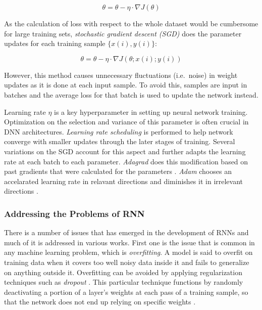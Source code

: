 \begin{equation}
 \theta =  \theta -  \eta \cdot \nabla J(  \theta )
\end{equation}

As the calculation of loss with respect to the whole dataset would be cumbersome for large training sets, \textit{stochastic gradient descent (SGD)} \citep{bengio_dl, sgd2} does the parameter updates for each training sample $\{ x ( i ) , y ( i ) \}$:

\begin{equation}
    \theta = \theta -  \eta \cdot  \nabla J ( \theta  ;  x ( i  ) ;  y  ( i ) )
\end{equation}

However, this method causes unnecessary fluctuations (i.e.~noise) in weight updates as it is done at each input sample. To avoid this, samples are input in batches and the average loss for that batch is used to update the network instead.

Learning rate $\eta$ is a key hyperparameter in setting up neural network training. Optimization on the selection and variance of this parameter is often crucial in DNN architectures. \textit{Learning rate scheduling} is performed to help network converge with smaller updates through the later stages of training. Several variations on the SGD account for this aspect and further adapts the learning rate at each batch to each parameter. \textit{Adagrad} does this modification based on past gradients that were calculated for the parameters \citep{adagrad}. \textit{Adam} chooses an accelarated learning rate in relavant directions and diminishes it in irrelevant directions \citep{DBLP:journals/corr/KingmaB14}. 

\subsubsection*{Addressing the Problems of RNN}
There is a number of issues that has emerged in the development of RNNs and much of it is addressed in various works. First one is the issue that is common in any machine learning problem, which is \textit{overfitting}. A model is said to overfit on training data when it covers too well noisy data inside it and fails to generalize on anything outside it. Overfitting can be avoided by applying regularization techniques such as \textit{dropout} \citep{dropout}. This particular technique functions by randomly deactivating a portion of a layer's weights at each pass of a training sample, so that the network does not end up relying on specific weights \citep{bengio_dl}.


